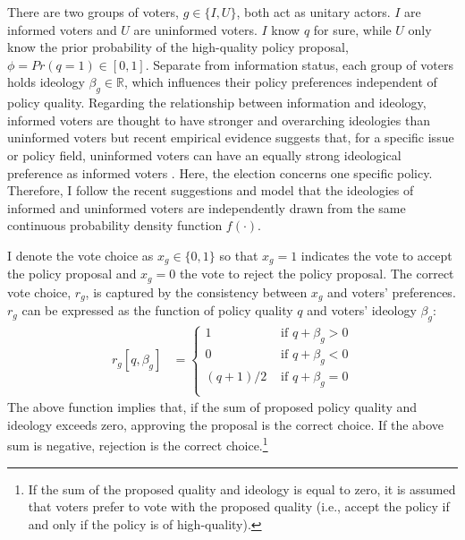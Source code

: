 \documentclass[letterpaper, 12pt]{article}
\begin{document}
    \par There are two groups of voters, $g \in \{I, U\}$, both act as unitary actors. $I$ are informed voters and $U$ are uninformed voters. $I$ know $q$ for sure, while $U$ only know the prior probability of the high-quality policy proposal, $\phi = Pr(q=1) \in [0, 1]$. Separate from information status, each group of voters holds ideology $\beta_g \in \mathbb{R}$, which influences their policy preferences independent of policy quality. Regarding the relationship between information and ideology, informed voters are thought to have stronger and overarching ideologies than uninformed voters \citep{Converse1964thna, Achen2016defo} but recent empirical evidence suggests that, for a specific issue or policy field, uninformed voters can have an equally strong ideological preference as informed voters \citep{Goren2012onvo, Broockman2016apto}. Here, the election concerns one specific policy. Therefore, I follow the recent suggestions and model that the ideologies of informed and uninformed voters are independently drawn from the same continuous probability density function $f(\cdot)$.
    
    \par I denote the vote choice as $x_g \in \{0,1\}$ so that $x_g=1$ indicates the vote to accept the policy proposal and $x_g=0$ the vote to reject the policy proposal. The correct vote choice, $r_g$, is captured by the consistency between $x_g$ and voters' preferences. $r_g$ can be expressed as the function of policy quality $q$ and voters' ideology $\beta_g$:
    \begin{align}
    r_g[q, \beta_g] &= \begin{cases}
    1 &\text{ if } q + \beta_g > 0 \\
    0 &\text{ if } q + \beta_g < 0  \\
    (q + 1)/2 &\text{ if } q + \beta_g = 0\\
    \end{cases}
    \end{align}
    \noindent The above function implies that, if the sum of proposed policy quality and ideology exceeds zero, approving the proposal is the correct choice. If the above sum is negative, rejection is the correct choice.\footnote{If the sum of the proposed quality and ideology is equal to zero, it is assumed that voters prefer to vote with the proposed quality (i.e., accept the policy if and only if the policy is of high-quality).}
    
\end{document}
